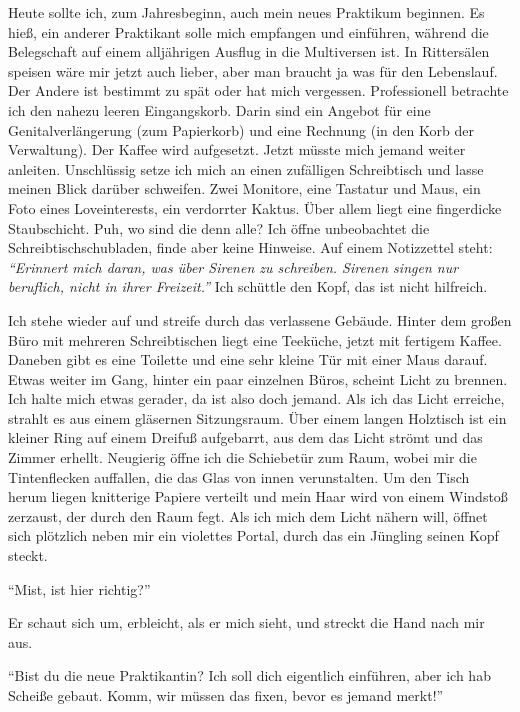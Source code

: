 \documentclass[final]{multiversum}
\begin{document}
Heute sollte ich, zum Jahresbeginn, auch mein neues Praktikum beginnen.
Es hieß, ein anderer Praktikant solle mich empfangen und einführen, während die Belegschaft auf einem alljährigen Ausflug in die Multiversen ist.
In Rittersälen speisen wäre mir jetzt auch lieber, aber man braucht ja was für den Lebenslauf.
Der Andere ist bestimmt zu spät oder hat mich vergessen.
Professionell betrachte ich den nahezu leeren Eingangskorb.
Darin sind ein Angebot für eine Genitalverlängerung (zum Papierkorb) und eine Rechnung (in den Korb der Verwaltung).
Der Kaffee wird aufgesetzt.
Jetzt müsste mich jemand weiter anleiten.
Unschlüssig setze ich mich an einen zufälligen Schreibtisch und lasse meinen Blick darüber schweifen.
Zwei Monitore, eine Tastatur und Maus, ein Foto eines Loveinterests, ein verdorrter Kaktus.
Über allem liegt eine fingerdicke Staubschicht.
Puh, wo sind die denn alle?
Ich öffne unbeobachtet die Schreibtischschubladen, finde aber keine Hinweise.
Auf einem Notizzettel steht:
\textit{\enquote{Erinnert mich daran, was über Sirenen zu schreiben. Sirenen singen nur beruflich, nicht in ihrer Freizeit.}}
Ich schüttle den Kopf, das ist nicht hilfreich.

Ich stehe wieder auf und streife durch das verlassene Gebäude.
Hinter dem großen Büro mit mehreren Schreibtischen liegt eine Teeküche, jetzt mit fertigem Kaffee.
Daneben gibt es eine Toilette und eine sehr kleine Tür mit einer Maus darauf.
Etwas weiter im Gang, hinter ein paar einzelnen Büros, scheint Licht zu brennen.
Ich halte mich etwas gerader, da ist also doch jemand.
Als ich das Licht erreiche, strahlt es aus einem gläsernen Sitzungsraum.
Über einem langen Holztisch ist ein kleiner Ring auf einem Dreifuß aufgebarrt, aus dem das Licht strömt und das Zimmer erhellt.
Neugierig öffne ich die Schiebetür zum Raum, wobei mir die Tintenflecken auffallen, die das Glas von innen verunstalten.
Um den Tisch herum liegen knitterige Papiere verteilt und mein Haar wird von einem Windstoß zerzaust, der durch den Raum fegt.
Als ich mich dem Licht nähern will, öffnet sich plötzlich neben mir ein violettes Portal, durch das ein Jüngling seinen Kopf steckt.

\enquote{Mist, ist hier richtig?}

Er schaut sich um, erbleicht, als er mich sieht, und streckt die Hand nach mir aus.

\enquote{Bist du die neue Praktikantin? Ich soll dich eigentlich einführen, aber ich hab Scheiße gebaut. 
Komm, wir müssen das fixen, bevor es jemand merkt!}
\end{document}
